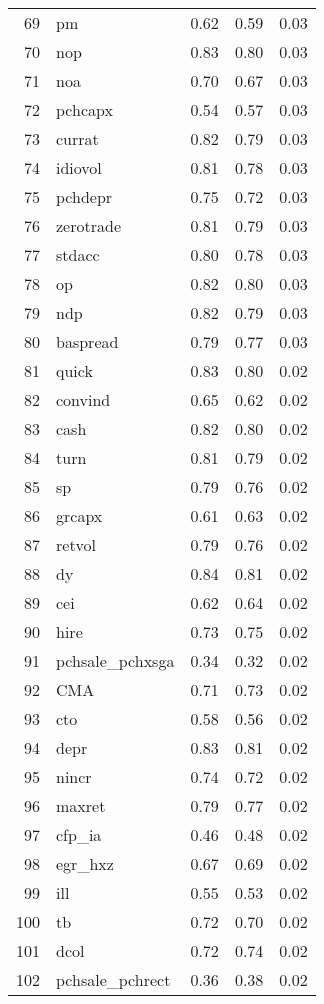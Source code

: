 \documentclass[12pt]{article}
\begin{document}
\begin{footnotesize}
\begin{longtable}{rl|c|c|c}
		69 & pm & 0.62 & 0.59 & 0.03 \\ 
		70 & nop & 0.83 & 0.80 & 0.03 \\ 
		71 & noa & 0.70 & 0.67 & 0.03 \\ 
		72 & pchcapx & 0.54 & 0.57 & 0.03 \\ 
		73 & currat & 0.82 & 0.79 & 0.03 \\ 
		74 & idiovol & 0.81 & 0.78 & 0.03 \\ 
		75 & pchdepr & 0.75 & 0.72 & 0.03 \\ 
		76 & zerotrade & 0.81 & 0.79 & 0.03 \\ 
		77 & stdacc & 0.80 & 0.78 & 0.03 \\ 
		78 & op & 0.82 & 0.80 & 0.03 \\ 
		79 & ndp & 0.82 & 0.79 & 0.03 \\ 
		80 & baspread & 0.79 & 0.77 & 0.03 \\ 
		81 & quick & 0.83 & 0.80 & 0.02 \\ 
		82 & convind & 0.65 & 0.62 & 0.02 \\ 
		83 & cash & 0.82 & 0.80 & 0.02 \\ 
		84 & turn & 0.81 & 0.79 & 0.02 \\ 
		85 & sp & 0.79 & 0.76 & 0.02 \\ 
		86 & grcapx & 0.61 & 0.63 & 0.02 \\ 
		87 & retvol & 0.79 & 0.76 & 0.02 \\ 
		88 & dy & 0.84 & 0.81 & 0.02 \\ 
		89 & cei & 0.62 & 0.64 & 0.02 \\ 
		90 & hire & 0.73 & 0.75 & 0.02 \\ 
		91 & pchsale\_pchxsga & 0.34 & 0.32 & 0.02 \\ 
		92 & CMA & 0.71 & 0.73 & 0.02 \\ 
		93 & cto & 0.58 & 0.56 & 0.02 \\ 
		94 & depr & 0.83 & 0.81 & 0.02 \\ 
		95 & nincr & 0.74 & 0.72 & 0.02 \\ 
		96 & maxret & 0.79 & 0.77 & 0.02 \\ 
		97 & cfp\_ia & 0.46 & 0.48 & 0.02 \\ 
		98 & egr\_hxz & 0.67 & 0.69 & 0.02 \\ 
		99 & ill & 0.55 & 0.53 & 0.02 \\ 
		100 & tb & 0.72 & 0.70 & 0.02 \\ 
		101 & dcol & 0.72 & 0.74 & 0.02 \\ 
		102 & pchsale\_pchrect & 0.36 & 0.38 & 0.02 \\ 

\end{longtable}
\end{footnotesize}
\end{document}

